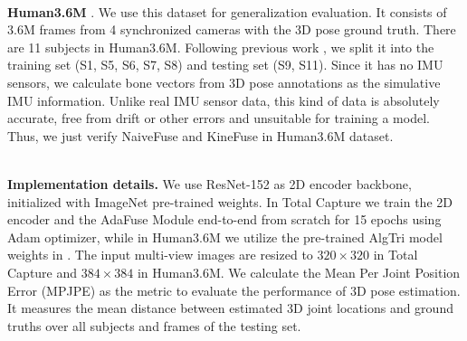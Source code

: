 \documentclass[lettersize,journal]{IEEEtran}
\begin{document}
~\\
\noindent \textbf{Human3.6M} \cite{ionescu2013human3}.
\quad We use this dataset for generalization evaluation. It consists of 3.6M frames from 4 synchronized cameras with the 3D pose ground truth. There are 11 subjects in Human3.6M. Following previous work \cite{sun2018integral}, we split it into the training set (S1, S5, S6, S7, S8) and testing set (S9, S11). Since it has no IMU sensors, we calculate bone vectors from 3D pose annotations as the simulative IMU information. Unlike real IMU sensor data, this kind of data is absolutely accurate, free from drift or other errors and unsuitable for training a model. Thus, we just verify NaiveFuse and KineFuse in Human3.6M dataset.

~\\
\noindent \textbf{Implementation details.}
\quad We use ResNet-152 \cite{he2016deep} as 2D encoder backbone, initialized with ImageNet pre-trained weights. In Total Capture we train the 2D encoder and the AdaFuse Module end-to-end from scratch for 15 epochs using Adam\cite{kingma2014adam} optimizer, while in Human3.6M we utilize the pre-trained AlgTri model weights in \cite{iskakov2019learnable}. The input multi-view images are resized to $320 \times 320$ in Total Capture and $384 \times 384$ in Human3.6M. We calculate the Mean Per Joint Position Error (MPJPE) as the metric to evaluate the performance of 3D pose estimation. It measures the mean distance between estimated 3D joint locations and ground truths over all subjects and frames of the testing set.
\end{document}
